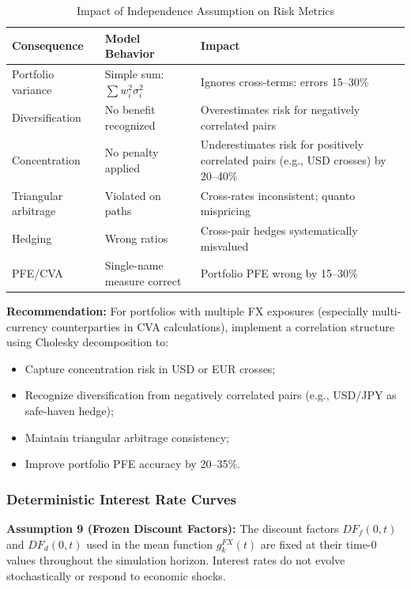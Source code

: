 \begin{table}[h!]
	\centering
	\footnotesize
	\begin{tabular}{|p{4cm}|p{5.5cm}|p{4.5cm}|}
		\hline
		\textbf{Consequence} & \textbf{Model Behavior} & \textbf{Impact} \\
		\hline
		Portfolio variance & Simple sum: $\sum w_i^2 \sigma_i^2$ & Ignores cross-terms: errors 15--30\% \\
		\hline
		Diversification & No benefit recognized & Overestimates risk for negatively correlated pairs \\
		\hline
		Concentration & No penalty applied & Underestimates risk for positively correlated pairs (e.g., USD crosses) by 20--40\% \\
		\hline
		Triangular arbitrage & Violated on paths & Cross-rates inconsistent; quanto mispricing \\
		\hline
		Hedging & Wrong ratios & Cross-pair hedges systematically misvalued \\
		\hline
		PFE/CVA & Single-name measure correct & Portfolio PFE wrong by 15--30\% \\
		\hline
	\end{tabular}
	\caption{Impact of Independence Assumption on Risk Metrics}
\end{table}

\textbf{Recommendation:} For portfolios with multiple FX exposures (especially multi-currency counterparties in CVA calculations), implement a correlation structure using Cholesky decomposition to:
\begin{itemize}
	\item Capture concentration risk in USD or EUR crosses;
	\item Recognize diversification from negatively correlated pairs (e.g., USD/JPY as safe-haven hedge);
	\item Maintain triangular arbitrage consistency;
	\item Improve portfolio PFE accuracy by 20--35\%.
\end{itemize}
\newpage

\subsubsection{Deterministic Interest Rate Curves}

\textbf{Assumption 9 (Frozen Discount Factors):} The discount factors $DF_f(0,t)$ and $DF_d(0,t)$ used in the mean function $g_k^{FX}(t)$ are fixed at their time-0 values throughout the simulation horizon. Interest rates do not evolve stochastically or respond to economic shocks.

